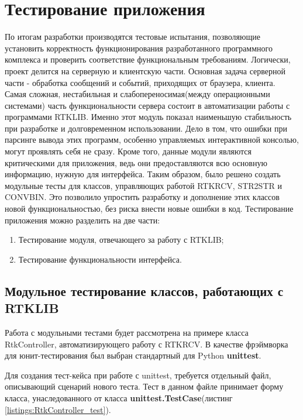 \chapter{Тестирование приложения} \label{chapt4}

По итогам разработки производятся тестовые испытания, позволяющие установить корректность функционирования разработанного программного комплекса и проверить соответствие функциональным требованиям. Логически, проект делится на серверную и клиентскую части. Основная задача серверной части - обработка сообщений и событий, приходящих от браузера, клиента. Самая сложная, нестабильная и слабопереносимая(между операционными системами) часть функциональности сервера состоит в автоматизации работы с программами RTKLIB. Именно этот модуль показал наименьшую стабильность при разработке и долговременном использовании. Дело в том, что ошибки при парсинге вывода этих программ, особенно управляемых интерактивной консолью, могут проявлять себя не сразу. Кроме того, данные модули являются критическими для приложения, ведь они предоставляются всю основную информацию, нужную для интерфейса. Таким образом, было решено создать модульные тесты для классов, управляющих работой RTKRCV, STR2STR и CONVBIN. Это позволило упростить разработку и дополнение этих классов новой функциональностью, без риска внести новые ошибки в код. Тестирование приложения можно разделить на две части:

\begin{enumerate}
  \item Тестирование модуля, отвечающего за работу с RTKLIB;
  \item Тестирование функциональности интерфейса.
\end{enumerate}

\section{Модульное тестирование классов, работающих с RTKLIB} \label{sect4_1}

Работа с модульными тестами будет рассмотрена на примере класса RtkController, автоматизирующего работу с RTKRCV. В качестве фрэймворка для юнит-тестирования был выбран стандартный для Python \textbf{unittest}.

Для создания тест-кейса при работе с unittest, требуется отдельный файл, описывающий сценарий нового теста. Тест в данном файле принимает форму класса, унаследованного от класса \textbf{unittest.TestCase}(листинг \ref{listings:RtkController_test}).

